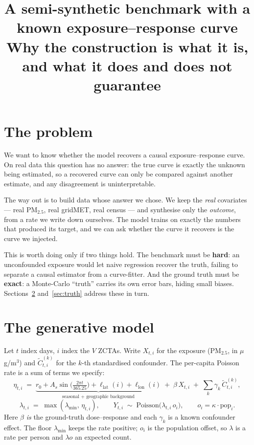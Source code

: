 \documentclass[11pt]{article}
\title{A semi-synthetic benchmark with a known exposure--response curve\\
\large Why the construction is what it is, and what it does and does not guarantee}
\author{}
\date{}
\begin{document}
\maketitle
\vspace{-2em}

\section{The problem}

We want to know whether the model recovers a causal exposure--response curve. On real data this
question has no answer: the true curve is exactly the unknown being estimated, so a recovered
curve can only be compared against another estimate, and any disagreement is uninterpretable.

The way out is to build data whose answer we chose. We keep the \emph{real} covariates --- real
PM$_{2.5}$, real gridMET, real census --- and synthesise only the \emph{outcome}, from a rate we
write down ourselves. The model trains on exactly the numbers that produced its target, and we can
ask whether the curve it recovers is the curve we injected.

This is worth doing only if two things hold. The benchmark must be \textbf{hard}: an unconfounded
exposure would let naive regression recover the truth, failing to separate a causal estimator from
a curve-fitter. And the ground truth must be \textbf{exact}: a Monte-Carlo ``truth'' carries its own
error bars, hiding small biases. Sections~\ref{sec:dgp} and~\ref{sec:truth} address these in turn.

\section{The generative model}\label{sec:dgp}

Let $t$ index days, $i$ index the $V$ ZCTAs. Write $X_{t,i}$ for the exposure (PM$_{2.5}$,
in $\mu$g/m$^3$) and $\tilde C^{(k)}_{t,i}$ for the $k$-th standardised confounder. The
per-capita Poisson rate is a sum of terms we specify:
\begin{equation}\label{eq:rate}
  \eta_{t,i} \;=\; \underbrace{r_0 + A_s \sin\!\Big(\tfrac{2\pi t}{365.25}\Big)
                  + \ell_{\mathrm{lat}}(i) + \ell_{\mathrm{lon}}(i)}_{\text{seasonal + geographic background}}
   \;+\; \beta\,X_{t,i} \;+\; \sum_k \gamma_k\, \tilde C^{(k)}_{t,i},
\end{equation}
\begin{equation}\label{eq:draw}
  \lambda_{t,i} \;=\; \max(\lambda_{\min},\,\eta_{t,i}), \qquad
  Y_{t,i} \;\sim\; \mathrm{Poisson}\big(\lambda_{t,i}\, o_i\big), \qquad
  o_i = \kappa \cdot \mathrm{pop}_i .
\end{equation}
Here $\beta$ \emph{is} the ground-truth dose--response and each $\gamma_k$ is a known confounder
effect. The floor $\lambda_{\min}$ keeps the rate positive; $o_i$ is the population offset, so
$\lambda$ is a rate per person and $\lambda o$ an expected count.
\end{document}
